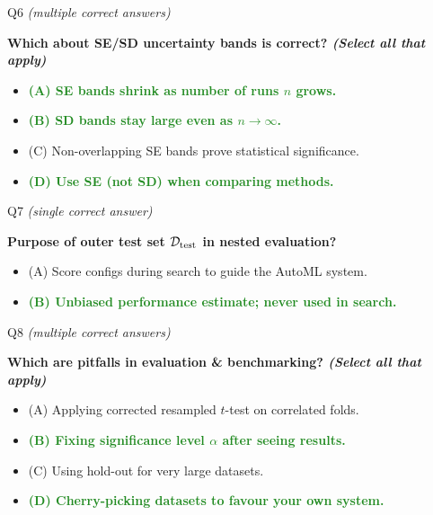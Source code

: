 \documentclass[main]{subfiles}
\newcommand{\correct}[1]{\textcolor{ForestGreen}{\textbf{#1} \checkmark}}
\newcommand{\wrong}[1]{#1}
\begin{document}
\begin{frame}{Q6 \hfill \small\normalfont\textit{(multiple correct answers)}}

\textbf{Which about SE/SD uncertainty bands is correct? \textit{(Select all that apply)}}

\begin{itemize}
    \item \correct{(A) \; SE bands shrink as number of runs $n$ grows.}
    \item \correct{(B) \; SD bands stay large even as $n \to \infty$.}
    \item \wrong{(C) \; Non-overlapping SE bands prove statistical significance.}
    \item \correct{(D) \; Use SE (not SD) when comparing methods.}
\end{itemize}

\end{frame}

\begin{frame}{Q7 \hfill \small\normalfont\textit{(single correct answer)}}

\textbf{Purpose of outer test set $\mathcal{D}_{\text{test}}$ in nested evaluation?}

\begin{itemize}
    \item \wrong{(A) \; Score configs during search to guide the AutoML system.}
    \item \correct{(B) \; Unbiased performance estimate; never used in search.}
\end{itemize}

\end{frame}

\begin{frame}{Q8 \hfill \small\normalfont\textit{(multiple correct answers)}}

\textbf{Which are pitfalls in evaluation \& benchmarking? \textit{(Select all that apply)}}

\begin{itemize}
    \item \wrong{(A) \; Applying corrected resampled $t$-test on correlated folds.}
    \item \correct{(B) \; Fixing significance level $\alpha$ after seeing results.}
    \item \wrong{(C) \; Using hold-out for very large datasets.}
    \item \correct{(D) \; Cherry-picking datasets to favour your own system.}
\end{itemize}

\end{frame}
\end{document}
